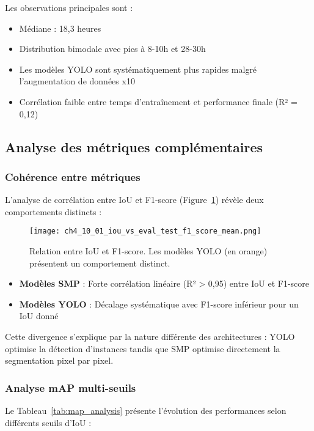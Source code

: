 Les observations principales sont :
\begin{itemize}
    \item Médiane : 18,3 heures
    \item Distribution bimodale avec pics à 8-10h et 28-30h
    \item Les modèles YOLO sont systématiquement plus rapides malgré l'augmentation de données x10
    \item Corrélation faible entre temps d'entraînement et performance finale (R² = 0,12)
\end{itemize}

\subsection{Analyse des métriques complémentaires}

\subsubsection{Cohérence entre métriques}

L'analyse de corrélation entre IoU et F1-score (Figure~\ref{fig:iou_vs_f1}) révèle deux comportements distincts :

\begin{figure}[htbp]
    \centering
    \texttt{[image: ch4\_10\_01\_iou\_vs\_eval\_test\_f1\_score\_mean.png]}
    \caption{Relation entre IoU et F1-score. Les modèles YOLO (en orange) présentent un comportement distinct.}
    \label{fig:iou_vs_f1}
\end{figure}

\begin{itemize}
    \item \textbf{Modèles SMP} : Forte corrélation linéaire (R² > 0,95) entre IoU et F1-score
    \item \textbf{Modèles YOLO} : Décalage systématique avec F1-score inférieur pour un IoU donné
\end{itemize}

Cette divergence s'explique par la nature différente des architectures : YOLO optimise la détection d'instances tandis que SMP optimise directement la segmentation pixel par pixel.

\subsubsection{Analyse mAP multi-seuils}

Le Tableau~\ref{tab:map_analysis} présente l'évolution des performances selon différents seuils d'IoU :

